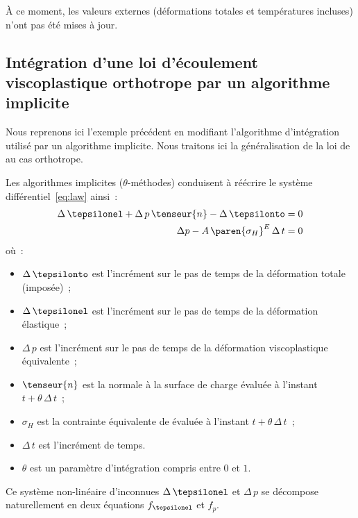 \documentclass[rectoverso,pleiades,pstricks,leqno,anti]{texmf/note_technique_2010}
\newcommand{\sigmaH}{\ensuremath{\sigma_{H}}}
\begin{document}
À ce moment, les valeurs externes (déformations totales et températures
incluses) n'ont pas été mises à jour.

\subsection{Intégration d'une loi d'écoulement viscoplastique
  orthotrope par un algorithme implicite}

Nous reprenons ici l'exemple précédent en modifiant l'algorithme
d'intégration utilisé par un algorithme implicite. Nous traitons ici la
généralisation de la loi de  au cas orthotrope.

Les algorithmes implicites (\(\theta\)-méthodes) conduisent à réécrire
le système différentiel~\eqref{eq:law} ainsi~:
\begin{equation}
  \begin{aligned}
    \Delta\,\tepsilonel + \Delta\,p\,\tenseur{n} - \Delta\,\tepsilonto &= 0 \\
    \Delta{p}   - A\,\paren{\sigmaH}^{E}\,\Delta\, t &= 0 \\
  \end{aligned}
\end{equation}
où~:
\begin{minipage}[t]{0.8\linewidth}
  \begin{itemize}
  \item \(\Delta\,\tepsilonto\) est l'incrément sur le pas de temps de
    la déformation totale (imposée)~;
  \item \(\Delta\,\tepsilonel\) est l'incrément sur le pas de temps de
    la déformation élastique~;
  \item \(\Delta\,p\) est l'incrément sur le pas de temps de la
    déformation viscoplastique équivalente~;
  \item \(\tenseur{n}\) est la normale à la surface de charge évaluée
    à l'instant \(t+\theta\,\Delta\,t\)~;
  \item \(\sigmaH\) est la contrainte équivalente de 
    évaluée à l'instant \(t+\theta\,\Delta\,t\)~;
  \item \(\Delta\,t\) est l'incrément de temps.
  \item \(\theta\) est un paramètre d'intégration compris entre \(0\)
    et \(1\).
  \end{itemize}
\end{minipage}

Ce système non-linéaire d'inconnues \(\Delta\,\tepsilonel\) et
\(\Delta\,p\) se décompose naturellement en deux équations
\(f_{\tepsilonel}\) et \(f_{p}\).
\end{document}
